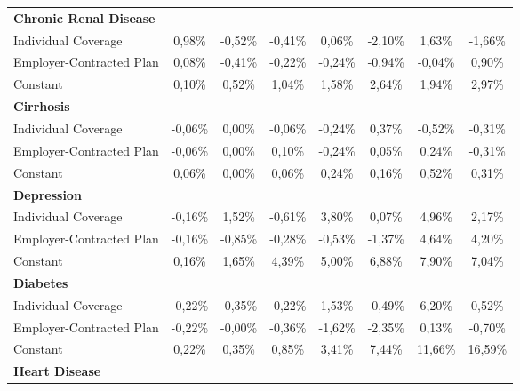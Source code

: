 \documentclass{article}
\begin{document}
\begin{table*}
{\begin{tabular}{l*{7}{c}}
\midrule
\textbf{Chronic Renal Disease} & & & & & & & \\

Individual Coverage & 0,98\% & -0,52\%\sym{***}& -0,41\% & 0,06\% & -2,10\%\sym{**} & 1,63\% & -1,66\% \\
Employer-Contracted Plan& 0,08\% & -0,41\%\sym{*}  & -0,22\% & -0,24\% & -0,94\% & -0,04\% & 0,90\% \\
Constant            & 0,10\% & 0,52\%\sym{***}& 1,04\%\sym{***}& 1,58\%\sym{***}& 2,64\%\sym{***}& 1,94\%\sym{***}& 2,97\%\sym{***}\\

\midrule
\textbf{Cirrhosis} & & & & & & & \\

Individual Coverage & -0,06\% & 0,00\% & -0,06\% & -0,24\%\sym{*}  & 0,37\% & -0,52\%\sym{*}  & -0,31\% \\
Employer-Contracted Plan& -0,06\% & 0,00\% & 0,10\% & -0,24\%\sym{*}  & 0,05\% & 0,24\% & -0,31\% \\
Constant            & 0,06\% & 0,00\% & 0,06\% & 0,24\%\sym{*}  & 0,16\% & 0,52\%\sym{*}  & 0,31\% \\

\midrule
\textbf{Depression} & & & & & & & \\

Individual Coverage & -0,16\% & 1,52\% & -0,61\% & 3,80\% & 0,07\% & 4,96\% & 2,17\% \\
Employer-Contracted Plan& -0,16\% & -0,85\%\sym{*}  & -0,28\% & -0,53\% & -1,37\% & 4,64\% & 4,20\% \\
Constant            & 0,16\% & 1,65\%\sym{***}& 4,39\%\sym{***}& 5,00\%\sym{***}& 6,88\%\sym{***}& 7,90\%\sym{***}& 7,04\%\sym{***}\\

\midrule
\textbf{Diabetes} & & & & & & & \\

Individual Coverage & -0,22\%\sym{**} & -0,35\%\sym{**} & -0,22\% & 1,53\% & -0,49\% & 6,20\% & 0,52\% \\
Employer-Contracted Plan& -0,22\%\sym{**} & -0,00\% & -0,36\% & -1,62\%\sym{*}  & -2,35\% & 0,13\% & -0,70\% \\
Constant            & 0,22\%\sym{**} & 0,35\%\sym{**} & 0,85\%\sym{***}& 3,41\%\sym{***}& 7,44\%\sym{***}& 11,66\%\sym{***}& 16,59\%\sym{***}\\

\midrule
\textbf{Heart Disease} & & & & & & & \\


\end{tabular}}
\end{table*}
\end{document}
